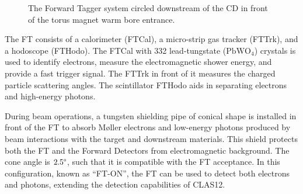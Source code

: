     \begin{figure}
        \centering{}
        \caption[FT]{The Forward Tagger system circled downstream of the CD in front of the torus magnet warm bore entrance.}
        \label{fig::ft}
    \end{figure}

    The FT consists of a calorimeter (FTCal), a micro-strip gas tracker (FTTrk), and a hodoscope (FTHodo).
    The FTCal with 332 lead-tungstate ($\text{PbWO}_4$) crystals is used to identify electrons, measure the electromagnetic shower energy, and provide a fast trigger signal.
    The FTTrk in front of it measures the charged particle scattering angles.
    The scintillator FTHodo aids in separating electrons and high-energy photons.

    During beam operations, a tungsten shielding pipe of conical shape is installed in front of the FT to absorb M\o ller electrons and low-energy photons produced by beam interactions with the target and downstream materials.
    This shield protects both the FT and the Forward Detectors from electromagnetic background.
    The cone angle is $2.5\degree$, such that it is compatible with the FT acceptance.
    In this configuration, known as ``FT-ON'', the FT can be used to detect both electrons and photons, extending the detection capabilities of CLAS12.

